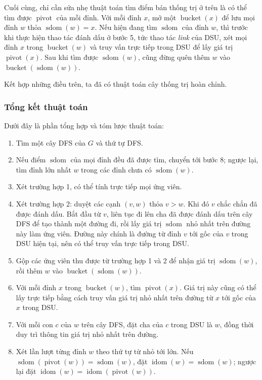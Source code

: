 \documentclass[11pt]{article}
\begin{document}
Cuối cùng, chỉ cần sửa nhẹ thuật toán tìm điểm bán thống trị ở trên là có thể
tìm được \(\operatorname{pivot}\) của mỗi đỉnh. Với mỗi đỉnh \(x\), mở một
\(\operatorname{bucket}(x)\) để lưu mọi đỉnh \(w\) thỏa
\(\operatorname{sdom}(w)=x\). Nếu hiện đang tìm \(\operatorname{sdom}\) của
đỉnh \(w\), thì trước khi thực hiện thao tác đánh dấu ở bước 5, tức thao tác
\emph{link} của DSU, xét mọi đỉnh \(x\) trong \(\operatorname{bucket}(w)\) và
truy vấn trực tiếp trong DSU để lấy giá trị \(\operatorname{pivot}(x)\). Sau
khi tìm được \(\operatorname{sdom}(w)\), cũng đừng quên thêm \(w\) vào
\(\operatorname{bucket}(\operatorname{sdom}(w))\).

Kết hợp những điều trên, ta đã có thuật toán cây thống trị hoàn chỉnh.

\subsubsection{Tổng kết thuật toán}

Dưới đây là phần tổng hợp và tóm lược thuật toán:

\begin{enumerate}
  \item Tìm một cây DFS của \(G\) và thứ tự DFS.
  \item Nếu điểm \(\operatorname{sdom}\) của mọi đỉnh đều đã được tìm, chuyển
  tới bước 8; ngược lại, tìm đỉnh lớn nhất \(w\) trong các đỉnh chưa có
  \(\operatorname{sdom}(w)\).
  \item Xét trường hợp 1, có thể tính trực tiếp mọi ứng viên.
  \item Xét trường hợp 2: duyệt các cạnh \((v,w)\) thỏa \(v>w\). Khi đó \(v\)
  chắc chắn đã được đánh dấu. Bắt đầu từ \(v\), liên tục đi lên cha đã được
  đánh dấu trên cây DFS để tạo thành một đường đi, rồi lấy giá trị
  \(\operatorname{sdom}\) nhỏ nhất trên đường này làm ứng viên. Đường này chính
  là đường từ đỉnh \(v\) tới gốc của \(v\) trong DSU hiện tại, nên có thể truy
  vấn trực tiếp trong DSU.
  \item Gộp các ứng viên thu được từ trường hợp 1 và 2 để nhận giá trị
  \(\operatorname{sdom}(w)\), rồi thêm \(w\) vào
  \(\operatorname{bucket}(\operatorname{sdom}(w))\).
  \item Với mỗi đỉnh \(x\) trong \(\operatorname{bucket}(w)\), tìm
  \(\operatorname{pivot}(x)\). Giá trị này cũng có thể lấy trực tiếp bằng cách
  truy vấn giá trị nhỏ nhất trên đường từ \(x\) tới gốc của \(x\) trong DSU.
  \item Với mỗi con \(c\) của \(w\) trên cây DFS, đặt cha của \(c\) trong DSU
  là \(w\), đồng thời duy trì thông tin giá trị nhỏ nhất trên đường.
  \item Xét lần lượt từng đỉnh \(w\) theo thứ tự từ nhỏ tới lớn. Nếu
  \(\operatorname{sdom}(\operatorname{pivot}(w))=\operatorname{sdom}(w)\), đặt
  \(\operatorname{idom}(w)=\operatorname{sdom}(w)\); ngược lại đặt
  \(\operatorname{idom}(w)=\operatorname{idom}(\operatorname{pivot}(w))\).
\end{enumerate}
\end{document}

